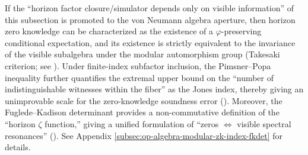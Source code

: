 \begin{remark}\label{rem:xi-hzom-opalgebra-takesaki-index-fkdet}
If the ``horizon factor closure/simulator depends only on visible information'' of this subsection is promoted to the von Neumann algebra aperture, then horizon zero knowledge can be characterized as
the existence of a \(\varphi\)-preserving conditional expectation, and its existence is strictly equivalent to the invariance of the visible subalgebra under the modular automorphism group (Takesaki criterion; see \cite{AccardiCecchini1982ConditionalExpectationsTakesaki,Takesaki1972ConditionalExpectationsVNA}).
Under finite-index subfactor inclusion, the Pimsner--Popa inequality further quantifies the extremal upper bound on the ``number of indistinguishable witnesses within the fiber'' as the Jones index,
thereby giving an unimprovable scale for the zero-knowledge soundness error (\cite{PimsnerPopa1986EntropyIndexSubfactors}).
Moreover, the Fuglede--Kadison determinant provides a non-commutative definition of the ``horizon \(\zeta\) function,'' giving a unified formulation of ``zeros \(\Leftrightarrow\) visible spectral resonances'' (\cite{FugledeKadison1951DeterminantsTraceFiniteFactors}).
See Appendix \ref{subsec:op-algebra-modular-zk-index-fkdet} for details.
\end{remark}

\endinput
